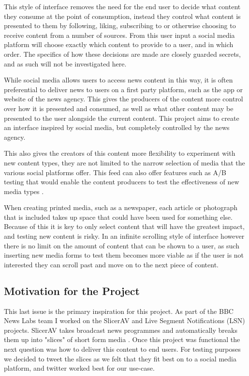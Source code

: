 \documentclass[12pt,titlepage]{article}
\begin{document}
  This style of interface removes the need for the end user to decide what
  content they consume at the point of consumption, instead they control what
  content is presented to them by following, liking, subscribing to or otherwise
  choosing to receive content from a number of sources. From this user input a
  social media platform will choose exactly which content to provide to a user,
  and in which order. The specifics of how these decisions are made are closely
  guarded secrets, and as such will not be investigated here.

  While social media allows users to access news content in this way, it is
  often preferential to deliver news to users on a first party platform, such as
  the app or website of the news agency. This gives the producers of the content
  more control over how it is presented and consumed, as well as what other
  content may be presented to the user alongside the current content. This
  project aims to create an interface inspired by social media, but completely
  controlled by the news agency.

  This also gives the creators of this content more flexibility to experiment
  with new content types, they are not limited to the narrow selection of media
  that the various social platforms offer. This feed can also offer features
  such as A/B testing that would enable the content producers to test the
  effectiveness of new media types \cite{ab}.

  When creating printed media, such as a newspaper, each article or photograph
  that is included takes up space that could have been used for something else.
  Because of this it is key to only select content that will have the greatest
  impact, and testing new content is risky. In an infinite scrolling style of
  interface however there is no limit on the amount of content that can be shown
  to a user, as such inserting new media forms to test them becomes more viable
  as if the user is not interested they can scroll past and move on to the next
  piece of content.

  \subsection{Motivation for the Project}

  This last issue is the primary inspiration for this project. As part of the
  BBC News Labs team I worked on the SlicerAV and Live Segment Notifications
  (LSN) projects. SlicerAV takes broadcast news programmes and automatically
  breaks them up into "slices" of short form media \cite{slicer}. Once this
  project was functional the next question was how to deliver this content to
  end users. For testing purposes we decided to tweet the slices as we felt that
  they fit best on to a social media platform, and twitter worked best for our
  use-case.
\end{document}
